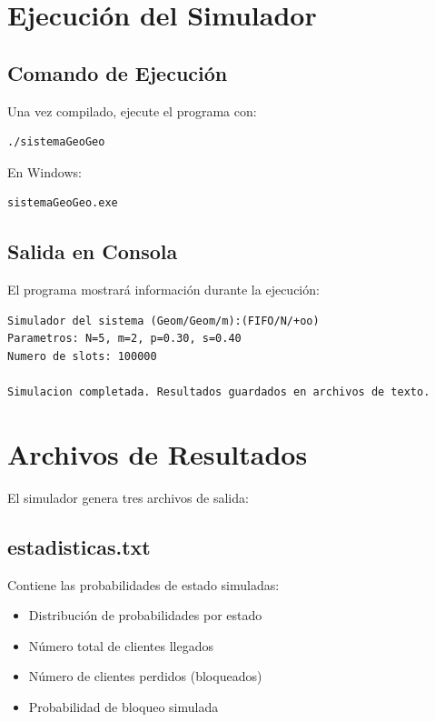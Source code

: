 \documentclass{article}
\begin{document}
\section{Ejecución del Simulador}

\subsection{Comando de Ejecución}
Una vez compilado, ejecute el programa con:

\begin{lstlisting}[language=bash]
./sistemaGeoGeo
\end{lstlisting}

En Windows:
\begin{lstlisting}[language=bash]
sistemaGeoGeo.exe
\end{lstlisting}

\subsection{Salida en Consola}
El programa mostrará información durante la ejecución:

\begin{lstlisting}
Simulador del sistema (Geom/Geom/m):(FIFO/N/+oo)
Parametros: N=5, m=2, p=0.30, s=0.40
Numero de slots: 100000

Simulacion completada. Resultados guardados en archivos de texto.
\end{lstlisting}

\section{Archivos de Resultados}

El simulador genera tres archivos de salida:

\subsection{estadisticas.txt}
Contiene las probabilidades de estado simuladas:
\begin{itemize}
    \item Distribución de probabilidades por estado
    \item Número total de clientes llegados
    \item Número de clientes perdidos (bloqueados)
    \item Probabilidad de bloqueo simulada
\end{itemize}
\end{document}
